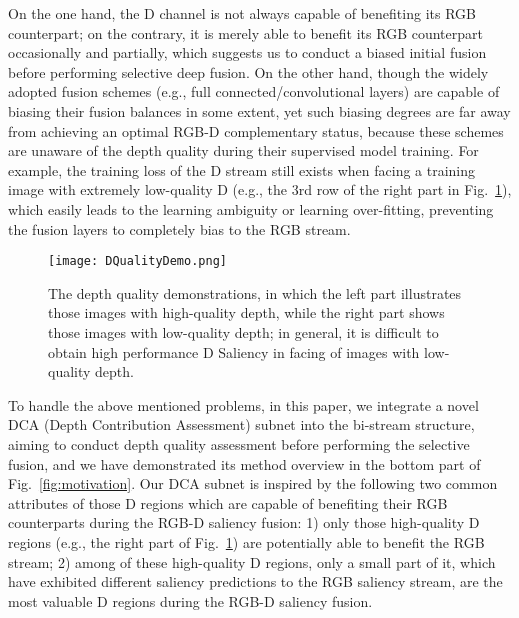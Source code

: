 \documentclass[journal]{IEEEtran}
\begin{document}
On the one hand, the D channel is not always capable of benefiting its RGB counterpart; on the contrary, it is merely able to benefit its RGB counterpart occasionally and partially, which suggests us to conduct a biased initial fusion before performing selective deep fusion.
On the other hand, though the widely adopted fusion schemes (e.g., full connected/convolutional layers) are capable of biasing their fusion balances in some extent, yet such biasing degrees are far away from achieving an optimal RGB-D complementary status, because these schemes are unaware of the depth quality during their supervised model training.
For example, the training loss of the D stream still exists when facing a training image with extremely low-quality D (e.g., the 3rd row of the right part in Fig.~\ref{fig:DQualityDemo}), which easily leads to the learning ambiguity or learning over-fitting, preventing the fusion layers to completely bias to the RGB stream.

\begin{figure}[t]
\centering
\texttt{[image: DQualityDemo.png]} \caption{The depth quality demonstrations, in which the left part illustrates those images with high-quality depth, while the right part shows those images with low-quality depth; in general, it is difficult to obtain high performance D Saliency in facing of images with low-quality depth.}
\label{fig:DQualityDemo}
\end{figure}

To handle the above mentioned problems, in this paper, we integrate a novel DCA (Depth Contribution
Assessment) subnet into the bi-stream structure, aiming to conduct depth quality assessment before performing the selective fusion, and we have demonstrated its method overview in the bottom part of Fig.~\ref{fig:motivation}.
Our DCA subnet is inspired by the following two common attributes of those D regions which are capable of benefiting their RGB counterparts during the RGB-D saliency fusion: 1) only those high-quality D regions (e.g., the right part of Fig.~\ref{fig:DQualityDemo}) are potentially able to benefit the RGB stream;
2) among of these high-quality D regions, only a small part of it, which have exhibited different saliency predictions to the RGB saliency stream, are the most valuable D regions during the RGB-D saliency fusion.
\end{document}
